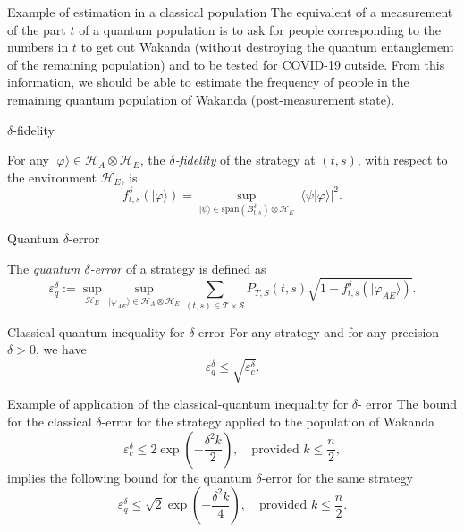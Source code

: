 \documentclass{beamer}
\begin{document}
\begin{frame}{Example of estimation in a classical population} 
The equivalent of a measurement of the part $t$ of a quantum population is to ask for people corresponding to the numbers in $t$ to get out Wakanda (without destroying the quantum entanglement of the remaining population) and to be tested for COVID-19 outside. From this information, we should be able to estimate the frequency of people in the remaining quantum population of Wakanda (post-measurement state).
\end{frame}

\begin{frame}{$\delta$-fidelity} 

For any $|\varphi\rangle \in \mathcal{H}_A \otimes \mathcal{H}_E$, the \emph{$\delta$-fidelity} of the strategy at $(t,s)$, with respect to the environment $\mathcal{H}_E$, is 
$$
f_{t,s}^{\delta}\left( |\varphi\rangle \right) = \sup_{| \psi \rangle \in \text{span}\left(B_{t,s}^{\delta}\right)\otimes \mathcal{H}_E}  | \langle \psi | \varphi \rangle |^2.
$$

\end{frame}

\begin{frame}{Quantum $\delta$-error} 

The \emph{quantum $\delta$-error} of a strategy is defined as
$$
\varepsilon_q^{\delta} :=\sup_{\mathcal{H}_E} \sup_{|\varphi_{AE}\rangle \in \mathcal{H}_A\otimes \mathcal{H}_E} \sum_{(t,s)\in\mathcal{T}\times\mathcal{S}} P_{T,S}(t,s) \sqrt{1 -  f_{t,s}^{\delta} \left(|\varphi_{AE}\rangle \right)}.
$$
\end{frame}


\begin{frame}{Classical-quantum inequality for $\delta$-error} 
For any strategy and for any precision $\delta > 0$, we have
$$
\varepsilon_q^{\delta} \leq \sqrt{ \varepsilon_c^{\delta} }.
$$
\end{frame}



\begin{frame}{Example of application of the classical-quantum inequality for $\delta$-
error} 
The bound for the classical $\delta$-error for the strategy applied to the population of Wakanda
$$
\varepsilon_c^{\delta} \leq 2 \exp\left( - \frac{\delta^2 k}{2} \right), \quad \text{provided } k \leq \frac{n}{2},
$$
implies the following bound for the quantum $\delta$-error for the same strategy
$$
\varepsilon_q^{\delta} \leq \sqrt{2} \exp\left( - \frac{\delta^2 k}{4} \right), \quad \text{provided } k \leq \frac{n}{2}.
$$
\end{frame}
\end{document}
